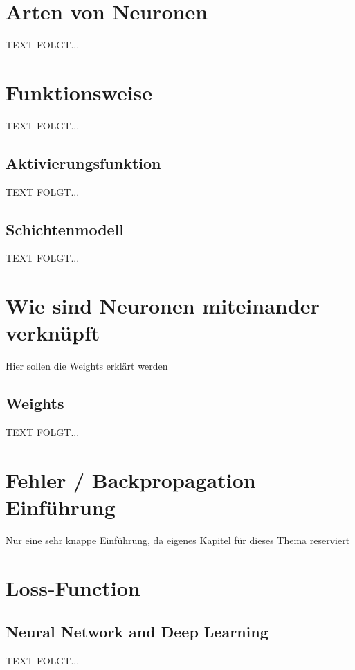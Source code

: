  \section{Arten von Neuronen}\label{arten_von_neuronen}
  TEXT FOLGT... 


\newpage
\section{Funktionsweise}\label{Funktionsweise}
  TEXT FOLGT... 
 

\newpage
\subsection{Aktivierungsfunktion}\label{Aktivierungsfunktion}
  TEXT FOLGT... 


\newpage
\subsection{Schichtenmodell}\label{Schichtenmodell}
  TEXT FOLGT... 

\newpage 
\section{Wie sind Neuronen miteinander verknüpft}\label{kap_verknuepfung_neuronen}  
%
Hier sollen die Weights erklärt werden

\subsection{Weights}\label{Weights}
  TEXT FOLGT... 

\newpage
\section{Fehler / Backpropagation Einführung}\label{kap_fehler_backpropagation}
Nur eine sehr knappe Einführung, da eigenes Kapitel für dieses Thema reserviert



\newpage
\section{Loss-Function}

\subsection{Neural Network and Deep Learning}\label{NN_deeplearning}
  TEXT FOLGT... 